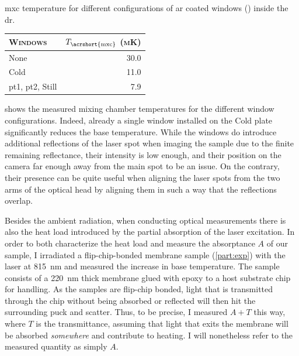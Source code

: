 \begin{margintable}
    \centering
    \footnotesize
    \caption{
        \Gls{mxc} temperature for different configurations of \gls{ar} coated windows (\thewindow) inside the \gls{dr}.
    }
    \label{tab:setup:cooling:windows}
    \begin{tabular}{lr}
        \toprule
        \textsc{Windows}                      & $T_\mathrm{\acrshort{mxc}}$ \textsc{(mK)} \\
        \midrule
        None                                  & 30.0                                      \\
        Cold                                  & 11.0                                      \\
        \acrshort{pt1}, \acrshort{pt2}, Still & 7.9                                       \\
        \bottomrule
    \end{tabular}
\end{margintable}

 shows the measured mixing chamber temperatures for the different window configurations.
Indeed, already a single window installed on the Cold plate significantly reduces the base temperature.
While the windows do introduce additional reflections of the laser spot when imaging the sample due to the finite remaining reflectance, their intensity is low enough, and their position on the camera far enough away from the main spot to be an issue.
On the contrary, their presence can be quite useful when aligning the laser spots from the two arms of the optical head by aligning them in such a way that the reflections overlap.

Besides the ambient radiation, when conducting optical measurements there is also the heat load introduced by the partial absorption of the laser excitation.
In order to both characterize the heat load and measure the absorptance $A$ of our sample, I irradiated a flip-chip-bonded membrane sample (\cf \cref{part:exp}) with the laser at \qty{815}{\nano\meter} and measured the increase in base temperature.
The sample consists of a \qty{220}{\nano\meter} thick \GaAsAlGaAs membrane glued with epoxy to a  host substrate chip for handling.
As the samples are flip-chip bonded, light that is transmitted through the chip without being absorbed or reflected will then hit the surrounding puck and scatter.
Thus, to be precise, I measured $A+T$ this way, where $T$ is the transmittance, assuming that light that exits the membrane will be absorbed \emph{somewhere} and contribute to heating.
I will nonetheless refer to the measured quantity as simply $A$.


